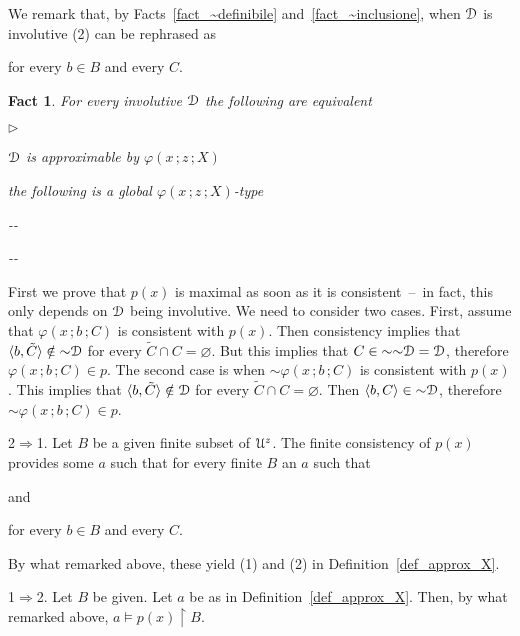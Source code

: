 \documentclass{amsproc}
\makeatletter
\newcommand{\mylabel}[1]{{#1}\hfill}
\renewenvironment{itemize}
  {\begin{list}{$\triangleright$}{%
  \setlength{\parskip}{0mm}
  \setlength{\topsep}{.1\baselineskip}
  \setlength{\rightmargin}{0mm}
  \setlength{\listparindent}{0mm}
  \setlength{\itemindent}{0mm}
  \setlength{\labelwidth}{3ex}
  \setlength{\itemsep}{.1\baselineskip}
  \setlength{\parsep}{.1\baselineskip}
  \setlength{\partopsep}{0mm}
  \setlength{\labelsep}{1ex}
  \setlength{\leftmargin}{\labelwidth+\labelsep}
  \let\makelabel\mylabel}}{%
\end{list}}
\newcounter{thm}
\theoremstyle{mio}
\newtheorem{fact}[thm]{Fact}\tcolorboxenvironment{fact}{mythm}
\providecommand{\proofNameStyle}{\bfseries}
\renewenvironment{proof}[1][\proofname]{\par
  \pushQED{\qed}%
  \normalfont%
  \trivlist
  \item[\hskip\labelsep
        \proofNameStyle
    #1\@addpunct{.}]\ignorespaces
}{%
  \popQED\endtrivlist\@endpefalse
}
\makeatother
\begin{document}
We remark that, by Facts~\ref{fact_~definibile} and~\ref{fact_~inclusione}, when ${\EuScript D}$ is involutive 
%
%
(2) can be rephrased as

\hfill for every $b\in B$ and every $C$.

\begin{fact}
  For every involutive ${\EuScript D}$ the following are equivalent
  \begin{itemize}
    \item [1.] ${\EuScript D}$ is approximable by $\varphi(x\,;z\,;X)$
    \item [2.] the following is a global $\varphi(x\,;z\,;X)$-type\smallskip
    
    \noindent\kern-\kern-
    \smallskip

    \noindent\kern-\kern-
  
  \end{itemize}
\end{fact}

\begin{proof}
  First we prove that $p(x)$ is maximal as soon as it is consistent~--~in fact, this only depends on ${\EuScript D}$ being involutive.
  We need to consider two cases.
  First, assume that $\varphi(x\,;b\,;C)$ is consistent with $p(x)$.
  Then consistency implies that $\langle b,\tilde C\rangle\notin{\sim}{\EuScript D}$ for every $\tilde C\cap C=\varnothing$.
  But this implies that $C\in{\sim}{\sim}{\EuScript D}={\EuScript D}$, therefore $\varphi(x\,;b\,;C)\in p$.
  The second case is when ${\sim}\varphi(x\,;b\,;C)$ is consistent with $p(x)$.
  This implies that $\langle b,\tilde C\rangle\notin{\EuScript D}$ for every $\tilde C\cap C=\varnothing$.
  Then $\langle b,C\rangle\in{\sim}{\EuScript D}$,  therefore ${\sim}\varphi(x\,;b\,;C)\in p$.

  2$\Rightarrow$1.
  Let $B$ be a given finite subset of ${\EuScript U}^z$.
  The finite consistency of $p(x)$ provides some $a$ such that for every finite $B$ an $a$ such that

  \quad and 
  
  \hfill for every $b\in B$ and every $C$. 

  By what remarked above, these yield (1) and (2) in Definition~\ref{def_approx_X}.
  
  1$\Rightarrow$2. 
  Let $B$ be given.
  Let $a$ be as in Definition~\ref{def_approx_X}.
  Then, by what remarked above, $a\models p(x)\restriction B$.
\end{proof}
\end{document}
